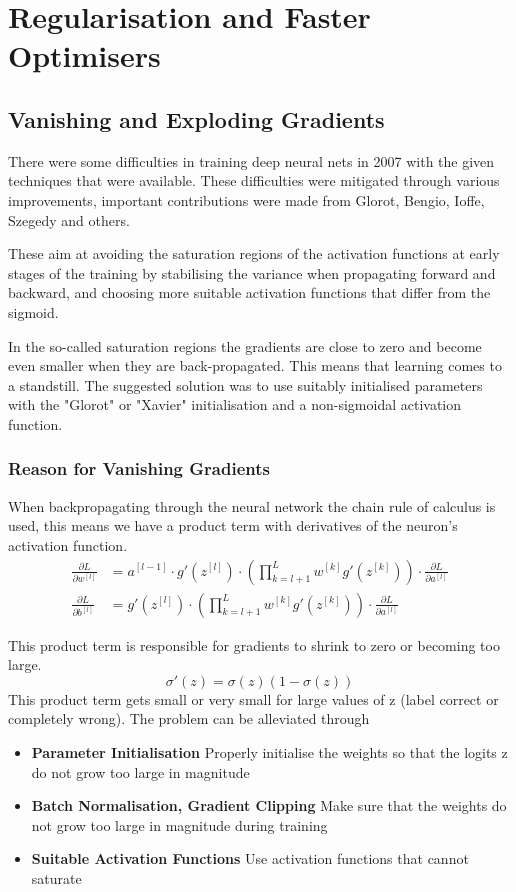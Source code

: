 \documentclass[11pt]{article}
\begin{document}
\section{Regularisation and Faster Optimisers}

\subsection{Vanishing and Exploding Gradients}
There were some difficulties in training deep neural nets in 2007 with the given techniques that were available. These difficulties were mitigated through various improvements, important contributions were made from Glorot, Bengio, Ioffe, Szegedy and others.

These aim at avoiding the saturation regions of the activation functions at early stages of the training by stabilising the variance when propagating forward and backward, and choosing more suitable activation functions that differ from the sigmoid.

In the so-called saturation regions the gradients are close to zero and become even smaller when they are back-propagated. This means that learning comes to a standstill. The suggested solution was to use suitably initialised parameters with the "Glorot" or "Xavier" initialisation and a non-sigmoidal activation function.

\subsubsection{Reason for Vanishing Gradients}

When backpropagating through the neural network the chain rule of calculus is used, this means we have a product term with derivatives of the neuron's activation function.
\begin{align*}
	\frac{\partial L}{\partial w^{[l]}} &= a^{[l-1]}\cdot g'\left(z^{[l]}\right)\cdot \left(\prod_{k=l+1}^{L}w^{[k]}g'(z^{[k]})\right)\cdot\frac{\partial L}{\partial a^{[l]}}\\
	\frac{\partial L}{\partial b^{[l]}} &= g'\left(z^{[l]}\right)\cdot \left(\prod_{k=l+1}^{L}w^{[k]}g'(z^{[k]})\right)\cdot\frac{\partial L}{\partial a^{[l]}}
\end{align*}

This product term is responsible for gradients to shrink to zero or becoming too large.
\begin{equation*}
	\sigma'(z) = \sigma(z)(1-\sigma(z))
\end{equation*}
This product term gets small or very small for large values of z (label correct or completely wrong). The problem can be alleviated through
\begin{itemize}
	\item \textbf{Parameter Initialisation} Properly initialise the weights so that the logits z do not grow too large in magnitude
	\item \textbf{Batch Normalisation, Gradient Clipping} Make sure that the weights do not grow too large in magnitude during training
	\item \textbf{Suitable Activation Functions} Use activation functions that cannot saturate
\end{itemize}
\end{document}
